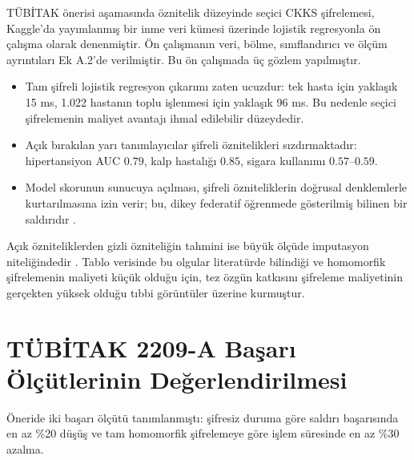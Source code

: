 TÜBİTAK önerisi aşamasında öznitelik düzeyinde seçici CKKS şifrelemesi, Kaggle'da yayımlanmış bir inme veri kümesi \cite{kaggle2021stroke} üzerinde lojistik regresyonla ön çalışma olarak denenmiştir. Ön çalışmanın veri, bölme, sınıflandırıcı ve ölçüm ayrıntıları Ek A.2'de verilmiştir. Bu ön çalışmada üç gözlem yapılmıştır.

\begin{itemize}
\item Tam şifreli lojistik regresyon çıkarımı zaten ucuzdur: tek hasta için yaklaşık 15 ms, 1.022 hastanın toplu işlenmesi için yaklaşık 96 ms. Bu nedenle seçici şifrelemenin maliyet avantajı ihmal edilebilir düzeydedir.
\item Açık bırakılan yarı tanımlayıcılar şifreli öznitelikleri sızdırmaktadır: hipertansiyon AUC $0.79$, kalp hastalığı $0.85$, sigara kullanımı $0.57$--$0.59$.
\item Model skorunun sunucuya açılması, şifreli özniteliklerin doğrusal denklemlerle kurtarılmasına izin verir; bu, dikey federatif öğrenmede gösterilmiş bilinen bir saldırıdır \cite{luo2021feature}.
\end{itemize}

Açık özniteliklerden gizli özniteliğin tahmini ise büyük ölçüde imputasyon niteliğindedir \cite{jayaraman2022imputation}. Tablo verisinde bu olgular literatürde bilindiği ve homomorfik şifrelemenin maliyeti küçük olduğu için, tez özgün katkısını şifreleme maliyetinin gerçekten yüksek olduğu tıbbi görüntüler üzerine kurmuştur.

\section{TÜBİTAK 2209-A Başarı Ölçütlerinin Değerlendirilmesi}\label{sec:tubitakolcut}

Öneride iki başarı ölçütü tanımlanmıştı: şifresiz duruma göre saldırı başarısında en az \%20 düşüş ve tam homomorfik şifrelemeye göre işlem süresinde en az \%30 azalma.

